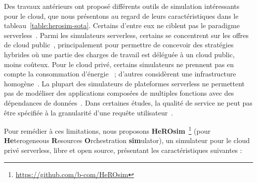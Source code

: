Des travaux antérieurs ont proposé différents outils de simulation intéressants pour le cloud, que nous présentons au regard de leurs caractéristiques dans le tableau~\ref{table:herosim-sota}. Certains d'entre eux ne ciblent pas le paradigme serverless~\cite{calheiros_cloudsim_2011, wickremasinghe_cloudanalyst_2010, cai_elasticsim_2017, buyyaGridSimToolkitModeling2002, nunez_icancloud_2012, mahmudIFogSim2ExtendedIFogSim2021}. Parmi les simulateurs serverless, certains se concentrent sur les offres de cloud public~\cite{nunez_icancloud_2012, mahmoudiSimFaaSPerformanceSimulator2021}, principalement pour permettre de concevoir des stratégies hybrides où une partie des charges de travail est déléguée à un cloud public, moins coûteux. Pour le cloud privé, certains simulateurs ne prennent pas en compte la consommation d'énergie~\cite{jeonCloudSimExtensionSimulatingDistributed2019, cai_elasticsim_2017, buyyaGridSimToolkitModeling2002, nunez_icancloud_2012} ; d'autres considèrent une infrastructure homogène~\cite{jeonCloudSimExtensionSimulatingDistributed2019, nunez_icancloud_2012, mahmoudiSimFaaSPerformanceSimulator2021}. La plupart des simulateurs de plateformes serverless ne permettent pas de modéliser des applications composées de multiples fonctions avec des dépendances de données~\cite{calheiros_cloudsim_2011, mampage_cloudsimsc_2023, wickremasinghe_cloudanalyst_2010, jeonCloudSimExtensionSimulatingDistributed2019, buyyaGridSimToolkitModeling2002, nunez_icancloud_2012, mahmudIFogSim2ExtendedIFogSim2021}. Dans certaines études, la qualité de service ne peut pas être spécifiée à la granularité d'une requête utilisateur~\cite{calheiros_cloudsim_2011, mampage_cloudsimsc_2023, wickremasinghe_cloudanalyst_2010, cai_elasticsim_2017, nunez_icancloud_2012, mahmudIFogSim2ExtendedIFogSim2021, mastenbroekOpenDCConvenientModeling2021, mahmoudiSimFaaSPerformanceSimulator2021}.

Pour remédier à ces limitations, nous proposons \textbf{HeROsim}~\footnote{\href{https://github.com/b-com/HeROsim}{https://github.com/b-com/HeROsim}} (pour \textbf{He}terogeneous \textbf{R}esources \textbf{O}rchestration \textbf{sim}ulator), un simulateur pour le cloud privé serverless, libre et open source, présentant les caractéristiques suivantes :


